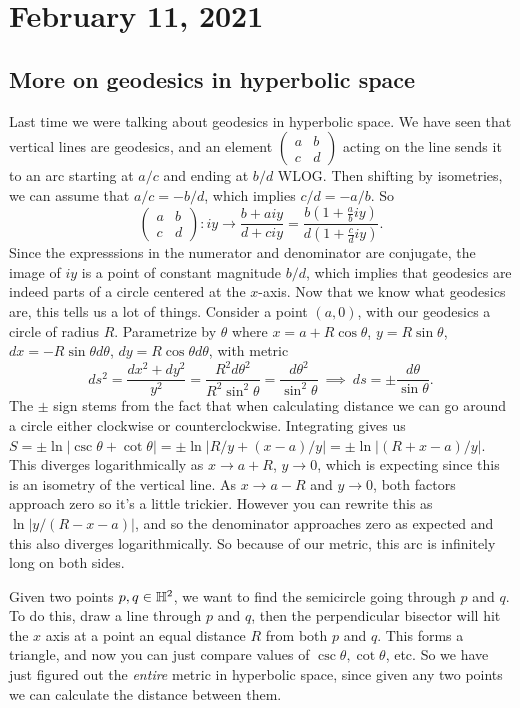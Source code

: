 \section{February 11, 2021} 

\subsection{More on geodesics in hyperbolic space}
Last time we were talking about geodesics in hyperbolic space. We have seen that vertical lines are geodesics, and an element $\left( 
\begin{smallmatrix}
    a& b \\ c & d
\end{smallmatrix}\right) $ acting on the line sends it to an arc starting at $a /c$ and ending at $b /d$ WLOG. Then shifting by isometries, we can assume that $a / c= -b /d$, which implies $c /d=-a /b$. So 
\[
\begin{pmatrix}
    a & b \\ c & d
\end{pmatrix}\colon iy \to \frac{b+aiy}{d+ciy}= \frac{b \left( 1+\frac{a}{b}iy \right) }{d\left( 1+ \frac{c}{d}iy \right) }.
\] Since the expresssions in the numerator and denominator are conjugate, the image of $iy$ is a point of constant magnitude $b /d$, which implies that geodesics are indeed parts of a circle centered at the $x$-axis. Now that we know what geodesics are, this tells us a lot of things. Consider a point $(a,0)$, with our geodesics a circle of radius $R$. Parametrize by $\theta$ where $x=a+R \cos \theta$, $y=R \sin \theta$, $dx=-R \sin \theta d\theta$, $dy=R \cos \theta d \theta$, with metric \[
ds^2= \frac{dx^2+dy^2}{y^2}= \frac{R^2 d \theta ^2}{R^2 \sin ^2 \theta}= \frac{d\theta ^2}{\sin ^2 \theta} \ \implies \ ds = \pm \frac{d\theta}{\sin \theta}.
\] The $\pm$ sign stems from the fact that when calculating distance we can go around a circle either clockwise or counterclockwise. Integrating gives us $S=\pm \ln | \csc \theta + \cot \theta|=\pm \ln | R /y+ (x-a) /y|=\pm \ln |(R+x-a) /y|$. This diverges logarithmically as $x\to a+R$, $y \to 0$, which is expecting since this is an isometry of the vertical line. As $x \to a-R$ and $y \to 0$, both factors approach zero so it's a little trickier. However you can rewrite this as $\ln |y / (R-x-a)|$, and so the denominator approaches zero as expected and this also diverges logarithmically. So because of our metric, this arc is infinitely long on both sides.

Given two points $p,q \in \mathbb{H}^2$, we want to find the semicircle going through $p$ and $q$. To do this, draw a line through $p$ and $q$, then the perpendicular bisector will hit the $x$ axis at a point an equal distance $R$ from both $p$ and $q$. This forms a triangle, and now you can just compare values of $\csc \theta, \cot \theta$, etc. So we have just figured out the \emph{entire} metric in hyperbolic space, since given any two points we can calculate the distance between them.

